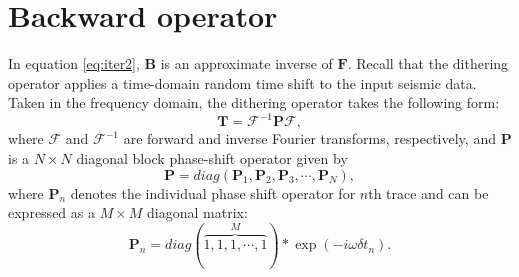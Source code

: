 \section{Backward operator}
In equation \ref{eq:iter2}, $\mathbf{B}$ is an approximate inverse of $\mathbf{F}$. 
Recall that the dithering operator applies a time-domain random time shift to the input seismic data. Taken in the frequency domain, the dithering operator takes the following form: 
\begin{equation}
\label{eq:ditherf}
\mathbf{T} = \mathbf{\mathcal{F}}^{-1}\mathbf{P}\mathbf{\mathcal{F}},
\end{equation}
where $\mathbf{\mathcal{F}}$ and $\mathbf{\mathcal{F}}^{-1}$ are forward and inverse Fourier transforms, respectively, and $\mathbf{P}$ is a $N\times N$ diagonal block phase-shift operator given by
\begin{equation}
\label{eq:phaseshift}
\mathbf{P}=diag(\mathbf{P}_1, \mathbf{P}_2, \mathbf{P}_3, \cdots, \mathbf{P}_N),
\end{equation}
where 
$\mathbf{P}_n$ denotes the individual phase shift operator for $n$th trace and can be expressed as a $M\times M$ diagonal matrix:
\begin{equation}
\label{eq:phaseshift1}
\mathbf{P}_n = diag(\overbrace{1,1,1, \cdots, 1}^{M})*\exp(-i\omega\delta t_n).
\end{equation}
